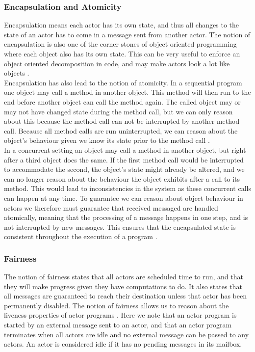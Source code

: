 \subsubsection{Encapsulation and Atomicity}
Encapsulation means each actor has its own state, and thus all changes to the state of an actor has to come in a message sent from another actor. The notion of encapsulation is also one of the corner stones of object oriented programming where each object also has its own state. This can be very useful to enforce an object oriented decomposition in code, and may make actors look a lot like objects \cite{ActorModelPaper}.\\
Encapsulation has also lead to the notion of atomicity. In a sequential program one object may call a method in another object. This method will then run to the end before another object can call the method again. The called object may or may not have changed state during the method call, but we can only reason about this because the method call can not be interrupted by another method call. Because all method calls are run uninterrupted, we can reason about the object's behaviour given we know its state prior to the method call \cite{ActorModelPaper}.\\
In a concurrent setting an object may call a method in another object, but right after a third object does the same. If the first method call would be interrupted to accommodate the second, the object's state might already be altered, and we can no longer reason about the behaviour the object exhibits after a call to its method. This would lead to inconsistencies in the system as these concurrent calls can happen at any time. To guarantee we can reason about object behaviour in actors we therefore must guarantee that received messaged are handled atomically, meaning that the processing of a message happens in one step, and is not interrupted by new messages. This ensures that the encapsulated state is consistent throughout the execution of a program \cite{ActorModelPaper}.

\subsubsection{Fairness}
The notion of fairness states that all actors are scheduled time to run, and that they will make progress given they have computations to do. It also states that all messages are guaranteed to reach their destination unless that actor has been permanently disabled. The notion of fairness allows us to reason about the liveness properties of actor programs \cite{ActorModelPaper}. Here we note that an actor program is started by an external message sent to an actor, and that an actor program terminates when all actors are idle and no external message can be passed to any actors. An actor is considered idle if it has no pending messages in its mailbox.


